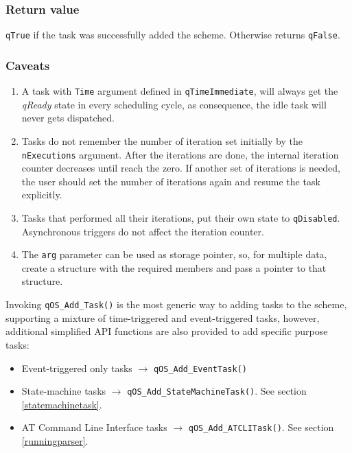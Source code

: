 \subsubsection*{Return value}
\lstinline{qTrue} if the task was successfully added the scheme. Otherwise returns \lstinline{qFalse}.

\subsubsection*{Caveats}
\begin{enumerate}
    \item A task with \lstinline{Time} argument defined in \lstinline{qTimeImmediate}, will always get the \textit{qReady} state in every scheduling cycle, as consequence, the idle task will never gets dispatched.
    \item Tasks do not remember the number of iteration set initially by the \lstinline{nExecutions} argument. After the iterations are done, the internal iteration counter decreases until reach the zero. If another set of iterations is needed, the user should set the number of iterations again and resume the task explicitly. 
    \item Tasks that performed all their iterations, put their own state to \lstinline{qDisabled}. Asynchronous triggers do not affect the iteration counter.
    \item The \lstinline{arg} parameter can be used as storage pointer, so, for multiple data, create a structure with the required members and pass a pointer to that structure.
\end{enumerate}

\noindent\hrulefill

Invoking \lstinline{qOS_Add_Task()}  is the most generic way to adding tasks to the scheme, supporting a mixture of time-triggered and event-triggered tasks, however, additional simplified API functions are also provided to add specific purpose tasks:
\begin{itemize}
    \item Event-triggered only tasks $\rightarrow$ \lstinline{qOS_Add_EventTask()}
    \item State-machine tasks $\rightarrow$ \lstinline{qOS_Add_StateMachineTask()}. See section \ref{statemachinetask}.
    \item AT Command Line Interface tasks $\rightarrow$ \lstinline{qOS_Add_ATCLITask()}. See section \ref{runningparser}.
\end{itemize}


